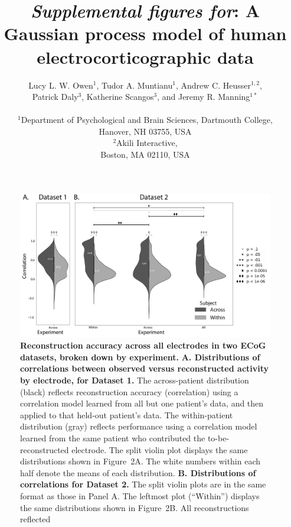 \documentclass[10pt]{article}
\title{\textit{Supplemental figures for}: A Gaussian process model of human electrocorticographic data}
\author{
  Lucy L. W. Owen$^{1}$,
  Tudor A. Muntianu$^{1}$,
  Andrew C. Heusser$^{1, 2}$, \\
  Patrick Daly$^{3}$,
  Katherine Scangos$^{3}$, and
  Jeremy R. Manning$^{1\ast}$\\\\
$^{1}$Department of Psychological and Brain Sciences, Dartmouth College,\\
Hanover, NH 03755, USA\\
$^{2}$Akili Interactive,\\
Boston, MA 02110, USA}
\begin{document}
\setcounter{equation}{0}
\setcounter{figure}{0}
\setcounter{table}{0}
\setcounter{page}{1}
\setcounter{section}{0}
\makeatletter
\renewcommand{\theequation}{S\arabic{equation}}
\renewcommand{\thefigure}{S\arabic{figure}}

\newcommand{\methods}{1}
\newcommand{\corrmaps}{2}
\newcommand{\freqs}{3}
\newcommand{\density}{4}
\newcommand{\infomap}{5}
\newcommand{\infomapfreqs}{6}

\begin{titlepage}
  \maketitle
\end{titlepage}

\begin{figure}[p]
\centering \includegraphics[width=\textwidth]{figs/supplemental_1}
\caption{\textbf{Reconstruction accuracy across all electrodes in two ECoG
datasets, broken down by experiment.} \textbf{A. Distributions of correlations
between observed versus reconstructed activity by electrode, for Dataset 1.}
The across-patient distribution (black) reflects reconstruction accuracy
(correlation) using a correlation model learned from all but one patient's data,
and then applied to that held-out patient's data. The within-patient
distribution (gray) reflects performance using a correlation model learned from
the same patient who contributed the to-be-reconstructed electrode.  The split
violin plot displays the same distributions shown in Figure~\corrmaps A.  The
white numbers within each half denote the means of each distribution. \textbf{B.
Distributions of correlations for Dataset 2.}  The split violin plots are in the
same format as those in Panel A.  The leftmost plot (``Within'') displays the
same distributions shown in Figure~\corrmaps B.  All reconstructions reflected
}
\end{figure}
\end{document}
